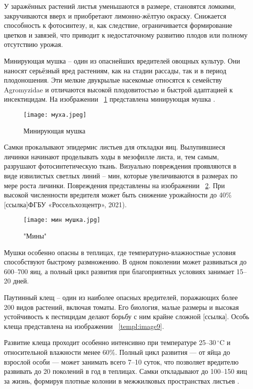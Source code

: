 У заражённых растений листья уменьшаются в размере, становятся ломкими, закручиваются вверх и приобретают лимонно-жёлтую окраску. Снижается способность к фотосинтезу, и, как следствие, ограничивается формирование цветков и завязей, что приводит к недостаточному развитию плодов или полному отсутствию урожая\cite{plant14}.

Минирующая мушка -- один из опаснейших вредителей овощных культур. Они наносят серьёзный вред растениям, как на стадии рассады, так и в период плодоношения. Эти мелкие двукрылые насекомые относятся к семейству Agromyzidae и отличаются высокой плодовитостью и быстрой адаптацией к инсектицидам. На изображении ~\ref{templ:image7} представлена минирующая мушка \cite{plant15}. 

\begin{figure}[h]
	\texttt{[image: муха.jpeg]}
	\caption{Минирующая мушка}
	\label{templ:image7}
\end{figure}


Самки прокалывают эпидермис листьев для откладки яиц. Вылупившиеся личинки начинают проделывать ходы в мезофилле листа, и, тем самым, разрушают фотосинтетическую ткань. Визуально повреждения проявляются в виде извилистых светлых линий -- мин, которые увеличиваются в размерах по мере роста личинки. Повреждения представлены на изображении ~\ref{templ:image8}. При высокой численности вредителя может быть снижение урожайности до 40\% [ссылка]ФГБУ «Россельхозцентр», 2021).

\begin{figure}[h]
	\texttt{[image: мин мушка.jpg]}
	\caption{"Мины"}
	\label{templ:image8}
\end{figure}

Мушки особенно опасны в теплицах, где температурно-влажностные условия способствуют быстрому размножению. В одном поколении может развиваться до 600–700 яиц, а полный цикл развития при благоприятных условиях занимает 15–20 дней.

Паутинный клещ -- один из наиболее опасных вредителей, поражающих более 200 видов растений, включая томаты. Его биология, малые размеры и высокая устойчивость к пестицидам делают борьбу с ним крайне сложной [ссылка]. Особь клеща представлена на изображении ~\ref{templ:image9}.

Развитие клеща проходит особенно интенсивно при температуре 25–30 $^{\circ}$C и относительной влажности менее 60\%. Полный цикл развития — от яйца до взрослой особи — может занимать всего 7–10 суток, что позволяет вредителю развивать до 20 поколений в год в теплицах. Самки откладывают до 100–150 яиц за жизнь, формируя плотные колонии в межжилковых пространствах листьев \cite{plant18}.


